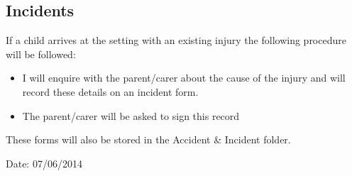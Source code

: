 \subsection{Incidents}

If a child arrives at the setting with an existing injury the following
procedure will be followed:

\begin{itemize}
\item
  I will enquire with the parent/carer about the cause of the injury
  and will record these details on an incident form.~
\item
  The parent/carer will be asked to sign this record~
\end{itemize}

These forms will also be stored in the Accident \& Incident folder.

Date: 07/06/2014



